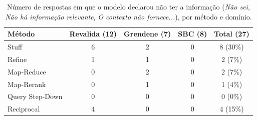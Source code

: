 \begin{table}[!t]
\centering
\footnotesize
\setlength{\tabcolsep}{4pt}
\caption{Número de respostas em que o modelo declarou não ter a informação (\emph{Não sei}, \emph{Não há informação relevante}, \emph{O contexto não fornece...}), por método e domínio.}
\label{tab:recusas}
\begin{tabular}{lcccc}
\toprule
Método & Revalida (12) & Grendene (7) & SBC (8) & Total (27) \\
\midrule
Stuff & 6 & 2 & 0 & 8 (30\%) \\
Refine & 1 & 1 & 0 & 2 (7\%) \\
Map-Reduce & 0 & 2 & 0 & 2 (7\%) \\
Map-Rerank & 0 & 1 & 0 & 1 (4\%) \\
Query Step-Down & 0 & 0 & 0 & 0 (0\%) \\
Reciprocal & 4 & 0 & 0 & 4 (15\%) \\
\bottomrule
\end{tabular}
\end{table}
